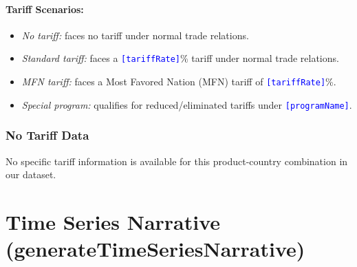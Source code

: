 \documentclass[12pt]{article}
\newcommand{\var}[1]{\textcolor{blue}{\texttt{[#1]}}}
\begin{document}
\paragraph{Tariff Scenarios:}
\begin{itemize}[noitemsep]
\item \textit{No tariff:} faces no tariff under normal trade relations.
\item \textit{Standard tariff:} faces a \var{tariffRate}\% tariff under normal trade relations.
\item \textit{MFN tariff:} faces a Most Favored Nation (MFN) tariff of \var{tariffRate}\%.
\item \textit{Special program:} qualifies for reduced/eliminated tariffs under \var{programName}.
\end{itemize}

\subsubsection{No Tariff Data}
No specific tariff information is available for this product-country combination in our dataset.

\section{Time Series Narrative (generateTimeSeriesNarrative)}
\end{document}
